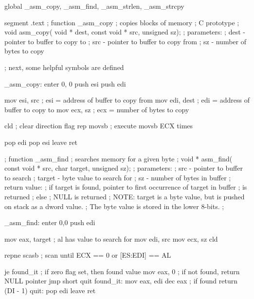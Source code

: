 \begin{AsmCodeListing}[label=memory.asm]
global _asm_copy, _asm_find, _asm_strlen, _asm_strcpy

segment .text
; function _asm_copy
; copies blocks of memory
; C prototype
; void asm_copy( void * dest, const void * src, unsigned sz);
; parameters:
;   dest - pointer to buffer to copy to
;   src  - pointer to buffer to copy from
;   sz   - number of bytes to copy

; next, some helpful symbols are defined

_asm_copy:
        enter   0, 0
        push    esi
        push    edi

        mov     esi, src        ; esi = address of buffer to copy from
        mov     edi, dest       ; edi = address of buffer to copy to
        mov     ecx, sz         ; ecx = number of bytes to copy

        cld                     ; clear direction flag 
        rep     movsb           ; execute movsb ECX times

        pop     edi
        pop     esi
        leave
        ret


; function _asm_find
; searches memory for a given byte
; void * asm_find( const void * src, char target, unsigned sz);
; parameters:
;   src    - pointer to buffer to search
;   target - byte value to search for
;   sz     - number of bytes in buffer
; return value:
;   if target is found, pointer to first occurrence of target in buffer
;   is returned
;   else
;     NULL is returned
; NOTE: target is a byte value, but is pushed on stack as a dword value.
;       The byte value is stored in the lower 8-bits.
; 

_asm_find:
        enter   0,0
        push    edi

        mov     eax, target     ; al has value to search for
        mov     edi, src
        mov     ecx, sz
        cld

        repne   scasb           ; scan until ECX == 0 or [ES:EDI] == AL

        je      found_it        ; if zero flag set, then found value
        mov     eax, 0          ; if not found, return NULL pointer
        jmp     short quit
found_it:
        mov     eax, edi          
        dec     eax              ; if found return (DI - 1)
quit:
        pop     edi
        leave
        ret



\end{AsmCodeListing}
